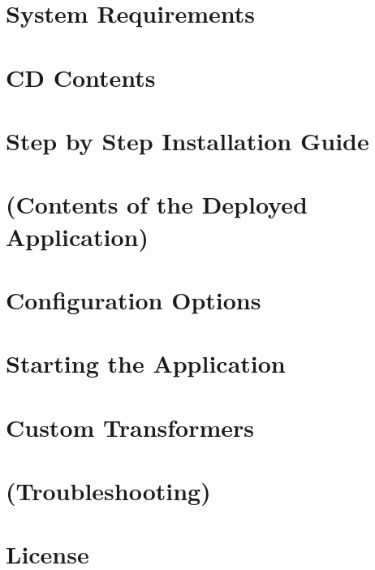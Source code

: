 
\newcommand{\version}{0.1}
\newcommand{\documentname}{\refadminmanual}





\renewcommand{\contentsname}{Contents}
\tableofcontents
\bigskip

\newpage


\chapter{System Requirements}

\chapter{CD Contents}

\chapter{Step by Step Installation Guide}

\chapter{(Contents of the Deployed Application)}

\chapter{Configuration Options}

\chapter{Starting the Application}


\chapter{Custom Transformers}

\chapter{(Troubleshooting)}



\appendix

\chapter{License}


